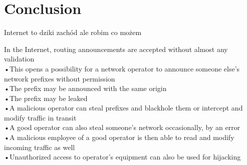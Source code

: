 \documentclass[journal,a4paper,twoside]{IEEEtran}
\begin{document}






\section{Conclusion}
\label{conclusion}

Internet to dziki zachód ale robim co możem 

\begin{displayquote}
	In the Internet, routing announcements are accepted without almost any validation\\
	•This opens a possibility for a network operator to announce someone else's network prefixes without permission\\
	•The prefix may be announced with the same origin\\
	•The prefix may be leaked\\
	•A malicious operator can steal prefixes and blackhole them or intercept and modify traffic in transit\\
	•A good operator can also steal someone's network occasionally, by an error\\
	•A malicious employee of a good operator is then able to read and modify incoming traffic as well\\
	•Unauthorized access to operator's equipment can also be used for hijacking
	\cite{Gavrichenkov2015}
	
	\end{displayquote}
	







\end{document}
